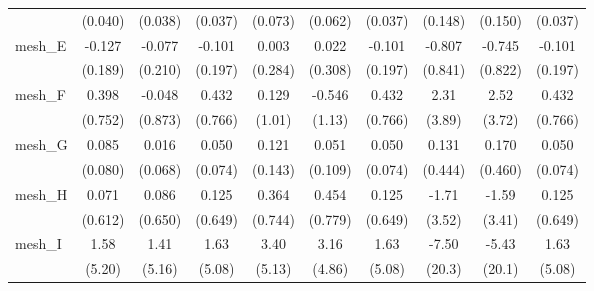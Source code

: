 \begin{tabular}{lccccccccc}
                                                               & (0.040)        & (0.038)        & (0.037)       & (0.073)        & (0.062)        & (0.037)       & (0.148)      & (0.150)     & (0.037)\\   
   mesh\_E                                                     & -0.127         & -0.077         & -0.101        & 0.003          & 0.022          & -0.101        & -0.807       & -0.745      & -0.101\\   
                                                               & (0.189)        & (0.210)        & (0.197)       & (0.284)        & (0.308)        & (0.197)       & (0.841)      & (0.822)     & (0.197)\\   
   mesh\_F                                                     & 0.398          & -0.048         & 0.432         & 0.129          & -0.546         & 0.432         & 2.31         & 2.52        & 0.432\\   
                                                               & (0.752)        & (0.873)        & (0.766)       & (1.01)         & (1.13)         & (0.766)       & (3.89)       & (3.72)      & (0.766)\\   
   mesh\_G                                                     & 0.085          & 0.016          & 0.050         & 0.121          & 0.051          & 0.050         & 0.131        & 0.170       & 0.050\\   
                                                               & (0.080)        & (0.068)        & (0.074)       & (0.143)        & (0.109)        & (0.074)       & (0.444)      & (0.460)     & (0.074)\\   
   mesh\_H                                                     & 0.071          & 0.086          & 0.125         & 0.364          & 0.454          & 0.125         & -1.71        & -1.59       & 0.125\\   
                                                               & (0.612)        & (0.650)        & (0.649)       & (0.744)        & (0.779)        & (0.649)       & (3.52)       & (3.41)      & (0.649)\\   
   mesh\_I                                                     & 1.58           & 1.41           & 1.63          & 3.40           & 3.16           & 1.63          & -7.50        & -5.43       & 1.63\\   
                                                               & (5.20)         & (5.16)         & (5.08)        & (5.13)         & (4.86)         & (5.08)        & (20.3)       & (20.1)      & (5.08)\\   

\end{tabular}
